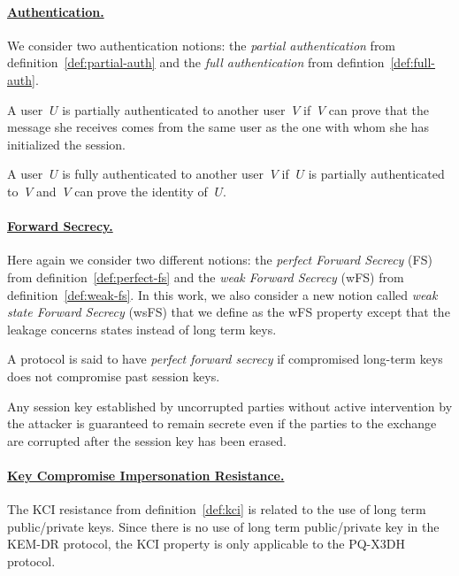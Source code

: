 \paragraph{\underline{Authentication.}} We consider two authentication notions: the \emph{partial authentication} from definition~\ref{def:partial-auth} and the \emph{full authentication} from defintion~\ref{def:full-auth}.

\begin{definition}
\label{def:partial-auth}
A user $\:U$ is partially authenticated to another user $\:V$ if $\:V$ can prove that the message she receives comes from the same user as the one with whom she has initialized the session.
\end{definition}
{}
\begin{definition}
\label{def:full-auth}
A user $\:U$ is fully authenticated to another user $\:V$ if $\:U$ is partially authenticated to $\:V$ and $\:V$ can prove the identity of $\:U$.
\end{definition}

\paragraph{\underline{Forward Secrecy.}} Here again we consider two different notions: the \emph{perfect Forward Secrecy} (FS) from definition~\ref{def:perfect-fs} and the \emph{weak Forward Secrecy} (wFS) from definition~\ref{def:weak-fs}. In this work, we also consider a new notion called \emph{weak state Forward Secrecy} (wsFS) that we define as the wFS property except that the leakage concerns states instead of long term keys.

\begin{definition}
\label{def:perfect-fs}
A protocol is said to have \emph{perfect forward secrecy} if compromised long-term keys does not compromise past session keys.
\end{definition}

\begin{definition}
\label{def:weak-fs}
Any session key established by uncorrupted parties without active intervention by the attacker is guaranteed to remain secrete
even if the parties to the exchange are corrupted after the session key has been erased.
\end{definition}

\paragraph{\underline{Key Compromise Impersonation Resistance.}} The KCI resistance from definition~\ref{def:kci} is related to the use of long term public/private keys. Since there is no use of long term public/private key in the KEM-DR protocol, the KCI property is only applicable to the PQ-X3DH protocol.

